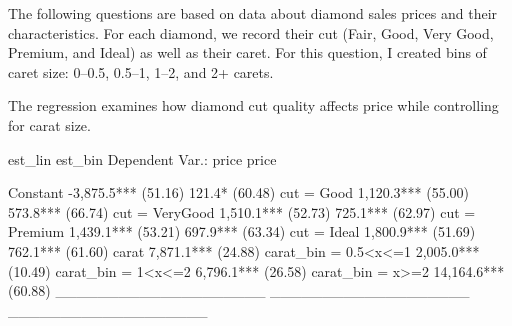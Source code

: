 \documentclass[12pt]{article}
\begin{document}
\newpage
The following questions are based on data about diamond sales prices and their characteristics. 
For each diamond, we record their cut (Fair, Good, Very Good, Premium, and Ideal) as well as their caret.
For this question, I created bins of caret size: 0--0.5, 0.5--1, 1--2, and 2+ carets.

The regression examines how diamond cut quality affects price while controlling for carat size.

  \begin{smallcodeblock}[{}]
                                 est_lin             est_bin
Dependent Var.:                    price               price
                                                            
Constant             -3,875.5*** (51.16)      121.4* (60.48)
cut = Good            1,120.3*** (55.00)    573.8*** (66.74)
cut = VeryGood        1,510.1*** (52.73)    725.1*** (62.97)
cut = Premium         1,439.1*** (53.21)    697.9*** (63.34)
cut = Ideal           1,800.9*** (51.69)    762.1*** (61.60)
carat                 7,871.1*** (24.88)                    
carat_bin = 0.5<x<=1                      2,005.0*** (10.49)
carat_bin = 1<x<=2                        6,796.1*** (26.58)
carat_bin = x>=2                         14,164.6*** (60.88)
____________________ ___________________ ___________________
  \end{smallcodeblock}
\end{document}
